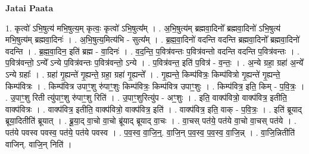 \documentclass[17pt]{extarticle}
\begin{document}
\textbf{Jatai Paata} \newline

1. कृत्वो॑ ऽभि॒षुत्य॑ मभि॒षुत्य॒म् कृत्वः॒ कृत्वो॑ ऽभि॒षुत्य᳚म् । . अ॒भि॒षुत्य॑म् ब्रह्मवा॒दिनो᳚ ब्रह्मवा॒दिनो॑ ऽभि॒षुत्य॑ मभि॒षुत्य॑म् ब्रह्मवा॒दिनः॑ । . अ॒भि॒षुत्य॒मित्य॑भि - सुत्य᳚म् । . ब्र॒ह्म॒वा॒दिनो॑ वदन्ति वदन्ति ब्रह्मवा॒दिनो᳚ ब्रह्मवा॒दिनो॑ वदन्ति । . ब्र॒ह्म॒वा॒दिन॒ इति॑ ब्रह्म - वा॒दिनः॑ । . व॒द॒न्ति॒ प॒वित्र॑वन्तः प॒वित्र॑वन्तो वदन्ति वदन्ति प॒वित्र॑वन्तः । . प॒वित्र॑वन्तो॒ ऽन्ये᳚ ऽन्ये प॒वित्र॑वन्तः प॒वित्र॑वन्तो॒ ऽन्ये । . प॒वित्र॑वन्त॒ इति॑ प॒वित्र॑ - व॒न्तः॒ । . अ॒न्ये ग्रहा॒ ग्रहा॑ अ॒न्ये᳚ ऽन्ये ग्रहाः᳚ । . ग्रहा॑ गृ॒ह्यन्ते॑ गृ॒ह्यन्ते॒ ग्रहा॒ ग्रहा॑ गृ॒ह्यन्ते᳚ । . गृ॒ह्यन्ते॒ किम्प॑वित्रः॒ किम्प॑वित्रो गृ॒ह्यन्ते॑ गृ॒ह्यन्ते॒ किम्प॑वित्रः । . किम्प॑वित्र उपाꣳ॒॒शु रु॑पाꣳ॒॒शुः किम्प॑वित्रः॒ किम्प॑वित्र उपाꣳ॒॒शुः । . किम्प॑वित्र॒ इति॒ किम् - प॒वि॒त्रः॒ । . उ॒पाꣳ॒॒शु रिती त्यु॑पाꣳ॒॒शु रु॑पाꣳ॒॒शु रिति॑ । . उ॒पाꣳ॒॒शुरित्यु॑प - अꣳ॒॒शुः । . इति॒ वाक्प॑वित्रो॒ वाक्प॑वित्र॒ इतीति॒ वाक्प॑वित्रः । . वाक्प॑वित्र॒ इतीति॒ वाक्प॑वित्रो॒ वाक्प॑वित्र॒ इति॑ । . वाक्प॑वित्र॒ इति॒ वाक् - प॒वि॒त्रः॒ । . इति॑ ब्रूयाद् ब्रूया॒दितीति॑ ब्रूयात् । . ब्रू॒या॒द् वा॒चो वा॒चो ब्रू॑याद् ब्रूयाद् वा॒चः । . वा॒चस् पत॑ये॒ पत॑ये वा॒चो वा॒चस् पत॑ये । . पत॑ये पवस्व पवस्व॒ पत॑ये॒ पत॑ये पवस्व । . प॒व॒स्व॒ वा॒जि॒न्॒. वा॒जि॒न् प॒व॒स्व॒ प॒व॒स्व॒ वा॒जि॒न्न् । . वा॒जि॒न्नितीति॑ वाजिन्. वाजि॒न् निति॑ । \newline
\end{document}
